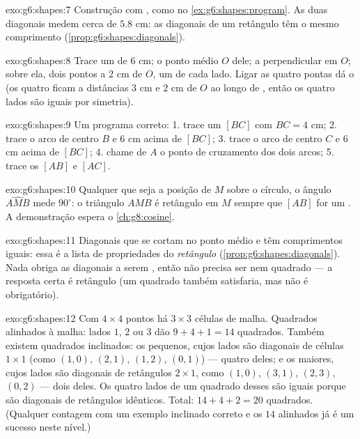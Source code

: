 \begin{solution}{exo:g6:shapes:7}
Construção com , como no \cref{ex:g6:shapes:program}.
As duas diagonais medem cerca de $5.8$ cm: as diagonais de um retângulo
têm o mesmo comprimento (\cref{prop:g6:shapes:diagonals}).
\end{solution}

\begin{solution}{exo:g6:shapes:8}
Trace um  de $6$ cm; o ponto médio $O$ dele; a perpendicular em
$O$; sobre ela, dois pontos a $2$ cm de $O$, um de cada lado. Ligar as
quatro pontas dá o  (os quatro  ficam a distâncias
$3$ cm e $2$ cm de $O$ ao longo de , então os
quatro lados são iguais por simetria).
\end{solution}

\begin{solution}{exo:g6:shapes:9}
Um programa correto:
1. trace um  $[BC]$ com $BC = 4$ cm;
2. trace o arco de centro $B$ e  $6$ cm acima de $[BC]$;
3. trace o arco de centro $C$ e  $6$ cm acima de $[BC]$;
4. chame de $A$ o ponto de cruzamento dos dois arcos;
5. trace os  $[AB]$ e $[AC]$.
\end{solution}

\begin{solution}{exo:g6:shapes:10}
Qualquer que seja a posição de $M$ sobre o círculo, o ângulo
$\widehat{AMB}$ mede $90^\circ$: o triângulo $AMB$ é retângulo em $M$
sempre que $[AB]$ for um . A demonstração espera o
\cref{ch:g8:cosine}.
\end{solution}

\begin{solution}{exo:g6:shapes:11}
Diagonais que se cortam no ponto médio e têm comprimentos iguais: essa
é a lista de propriedades do \emph{retângulo}
(\cref{prop:g6:shapes:diagonals}). Nada obriga as diagonais a serem
, então não precisa ser  nem quadrado --- a
resposta certa é retângulo (um quadrado também satisfaria, mas não é
obrigatório).
\end{solution}

\begin{solution}{exo:g6:shapes:12}
Com $4 \times 4$ pontos há $3 \times 3$ células de malha. Quadrados
alinhados à malha: lados $1$, $2$ ou $3$ dão $9 + 4 + 1 = 14$
quadrados. Também existem quadrados inclinados: os pequenos, cujos
lados são diagonais de células $1 \times 1$ (como $(1,0)$, $(2,1)$,
$(1,2)$, $(0,1)$) --- quatro deles; e os maiores, cujos lados são
diagonais de retângulos $2 \times 1$, como $(1,0)$, $(3,1)$, $(2,3)$,
$(0,2)$ --- dois deles. Os quatro lados de um quadrado desses são
iguais porque são diagonais de retângulos idênticos. Total:
$14 + 4 + 2 = 20$ quadrados. (Qualquer contagem com um exemplo
inclinado correto e os $14$ alinhados já é um sucesso neste nível.)
\end{solution}

